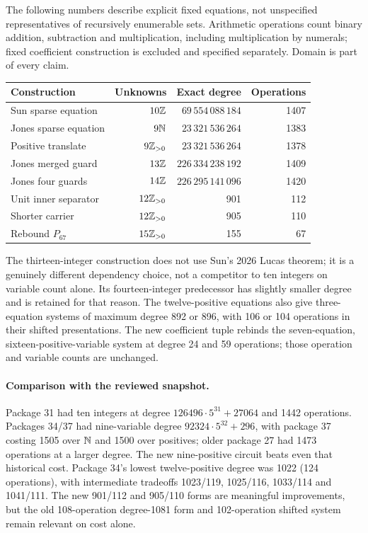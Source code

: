 The following numbers describe explicit fixed equations, not unspecified representatives of recursively enumerable sets. Arithmetic operations count binary addition, subtraction and multiplication, including multiplication by numerals; fixed coefficient construction is excluded and specified separately. Domain is part of every claim.
\begin{center}\small
\begin{tabular}{@{}lrrr@{}}\toprule
Construction & Unknowns & Exact degree & Operations\\\midrule
Sun sparse equation & $10\mathbb Z$ & $69\,554\,088\,184$ & 1407\\
Jones sparse equation & $9\mathbb N$ & $23\,321\,536\,264$ & 1383\\
Positive translate & $9\mathbb Z_{>0}$ & $23\,321\,536\,264$ & 1378\\
Jones merged guard & $13\mathbb Z$ & $226\,334\,238\,192$ & 1409\\
Jones four guards & $14\mathbb Z$ & $226\,295\,141\,096$ & 1420\\
Unit inner separator & $12\mathbb Z_{>0}$ & 901 & 112\\
Shorter carrier & $12\mathbb Z_{>0}$ & 905 & 110\\
Rebound $P_{67}$ & $15\mathbb Z_{>0}$ & 155 & 67\\\bottomrule
\end{tabular}
\end{center}
The thirteen-integer construction does not use Sun's 2026 Lucas theorem; it is a genuinely different dependency choice, not a competitor to ten integers on variable count alone. Its fourteen-integer predecessor has slightly smaller degree and is retained for that reason. The twelve-positive equations also give three-equation systems of maximum degree 892 or 896, with 106 or 104 operations in their shifted presentations. The new coefficient tuple rebinds the seven-equation, sixteen-positive-variable system at degree 24 and 59 operations; those operation and variable counts are unchanged.

\paragraph{Comparison with the reviewed snapshot.}
Package 31 had ten integers at degree $126496\cdot5^{31}+27064$ and 1442 operations. Packages 34/37 had nine-variable degree $92324\cdot5^{32}+296$, with package 37 costing 1505 over $\mathbb N$ and 1500 over positives; older package 27 had 1473 operations at a larger degree. The new nine-positive circuit beats even that historical cost. Package 34's lowest twelve-positive degree was 1022 (124 operations), with intermediate tradeoffs 1023/119, 1025/116, 1033/114 and 1041/111. The new 901/112 and 905/110 forms are meaningful improvements, but the old 108-operation degree-1081 form and 102-operation shifted system remain relevant on cost alone.


